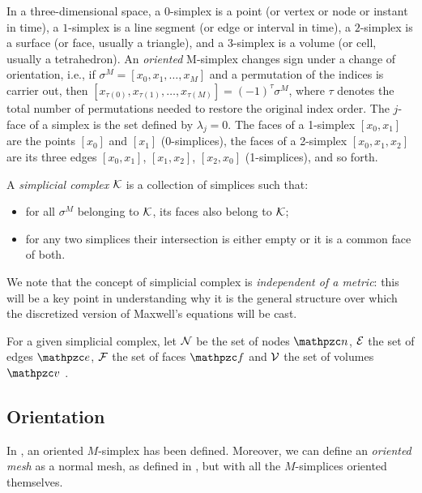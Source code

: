 In a three-dimensional space, a $0$-simplex is a point (or vertex or
node or instant in time), a $1$-simplex is a line segment (or edge or
interval in time), a $2$-simplex is a surface (or face, usually a
triangle), and a $3$-simplex is a volume (or cell, usually a
tetrahedron). An \emph{oriented} M-simplex changes sign under a change
of orientation, i.e., if $\sigma^M = [x_0,x_1,\dotsc,x_M]$ and a
permutation of the indices is carrier out, then
$[x_{\tau(0)},x_{\tau(1)},\dotsc, x_{\tau(M)}] = (-1)^\tau \sigma^M$,
where $\tau$ denotes the total number of permutations needed to
restore the original index order. The $j$-face of a simplex is the set
defined by $\lambda_j = 0$. The faces of a 1-simplex $[x_0,x_1]$ are
the points $[x_0]$ and $[x_1]$ (0-simplices), the faces of a 2-simplex
$[x_0,x_1,x_2]$ are its three edges $[x_0,x_1]$, $[x_1,x_2]$,
$[x_2,x_0]$ (1-simplices), and so forth.

\begin{definition} \label{def:simplicial_complex}
  A \emph{simplicial complex} $\mathcal{K}$ is a collection of simplices such
  that:
  \begin{itemize}
  \item
    for all $\sigma^M$ belonging to $\mathcal{K}$, its faces also belong to
    $\mathcal{K}$;
  \item
    for any two simplices their intersection is either empty or it is a
    common face of both.
  \end{itemize}
\end{definition}

We note that the concept of simplicial complex is \emph{independent of
  a metric}: this will be a key point in understanding why it is the
general structure over which the discretized version of Maxwell's
equations will be cast.

For a given simplicial complex, let $\mathcal{N}$ be the set of nodes
$\Point{n}$, $\mathcal{E}$ the set of edges $\Line{e}$, $\mathcal{F}$ the set
of faces $\Surface{f}$ and $\mathcal{V}$ the set of volumes $\Volume{v}$
\cite{trevisan_geometric,rienen_frequency}.

\subsection{Orientation}  \label{sec:mesh:orientation}

In , an oriented $M$-simplex has been
defined. Moreover, we can define an \emph{oriented mesh} as a normal
mesh, as defined in , but with all the
$M$-simplices oriented themselves.


